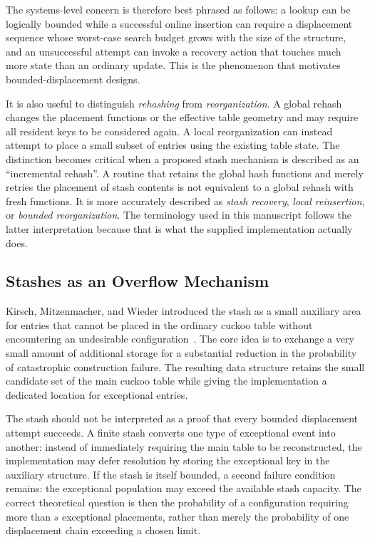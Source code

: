 \documentclass[conference]{IEEEtran}
\begin{document}
The systems-level concern is therefore best phrased as follows: a lookup can be logically bounded while a successful online insertion can require a displacement sequence whose worst-case search budget grows with the size of the structure, and an unsuccessful attempt can invoke a recovery action that touches much more state than an ordinary update. This is the phenomenon that motivates bounded-displacement designs.

It is also useful to distinguish \emph{rehashing} from \emph{reorganization}. A global rehash changes the placement functions or the effective table geometry and may require all resident keys to be considered again. A local reorganization can instead attempt to place a small subset of entries using the existing table state. The distinction becomes critical when a proposed stash mechanism is described as an ``incremental rehash''. A routine that retains the global hash functions and merely retries the placement of stash contents is not equivalent to a global rehash with fresh functions. It is more accurately described as \emph{stash recovery}, \emph{local reinsertion}, or \emph{bounded reorganization}. The terminology used in this manuscript follows the latter interpretation because that is what the supplied implementation actually does.

\subsection{Stashes as an Overflow Mechanism}

Kirsch, Mitzenmacher, and Wieder introduced the stash as a small auxiliary area for entries that cannot be placed in the ordinary cuckoo table without encountering an undesirable configuration~\cite{kirsch2009stash}. The core idea is to exchange a very small amount of additional storage for a substantial reduction in the probability of catastrophic construction failure. The resulting data structure retains the small candidate set of the main cuckoo table while giving the implementation a dedicated location for exceptional entries.

The stash should not be interpreted as a proof that every bounded displacement attempt succeeds. A finite stash converts one type of exceptional event into another: instead of immediately requiring the main table to be reconstructed, the implementation may defer resolution by storing the exceptional key in the auxiliary structure. If the stash is itself bounded, a second failure condition remains: the exceptional population may exceed the available stash capacity. The correct theoretical question is then the probability of a configuration requiring more than $s$ exceptional placements, rather than merely the probability of one displacement chain exceeding a chosen limit.
\end{document}
